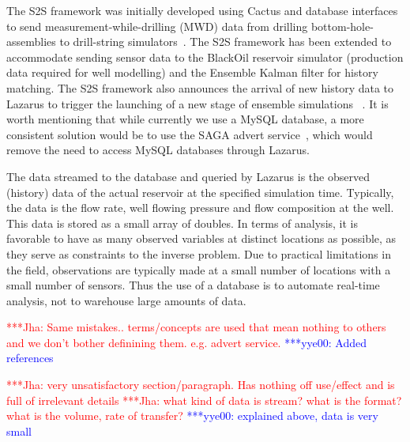 \documentclass{acm_proc_article-sp}
\newcommand{\jhanote}[1]{ {\textcolor{red} { ***Jha: #1 }}}
\newcommand{\yyenote}[1]{ {\textcolor{blue} { ***yye00: #1 }}}
\newcommand{\jhanote}[1]{}
\newcommand{\yyenote}[1]{}
\begin{document}
The S2S framework was initially developed using Cactus and database
interfaces to send measurement-while-drilling (MWD) data from drilling
bottom-hole-assemblies to drill-string simulators~\cite{Duff1,
  Duff2}. The S2S framework has been extended to accommodate sending
sensor data to the BlackOil reservoir simulator (production data
required for well modelling) and the Ensemble Kalman filter for
history matching.  The S2S framework also announces the arrival of new
history data to Lazarus to trigger the launching of a new stage of
ensemble simulations ~\cite{Duff1,Duff2}.  It is worth mentioning that
while currently we use a MySQL database, a more consistent solution
would be to use the SAGA advert service~\cite{saga_sc05}, which would
remove the need to access MySQL databases through Lazarus.

The data streamed to the database and queried by Lazarus is the observed
(history) data of the actual reservoir at the specified simulation time. Typically,
the data is the flow rate, well flowing pressure and flow composition
at the well. This data is stored as a small array of doubles.
In terms of analysis, it is favorable to have as many observed variables
at distinct locations as possible, as they serve as constraints to the inverse
problem. Due to practical limitations in the field, observations are typically made at a
small number of locations with a small number of sensors. Thus the use
of a database is to automate real-time analysis, not to warehouse large amounts of data.


\jhanote{Same mistakes.. terms/concepts are used
that mean nothing to others and we don't bother definining
them. e.g. advert service.}\yyenote{Added references}

\jhanote{very unsatisfactory section/paragraph. Has nothing off
  use/effect and is full of irrelevant details}
\jhanote{what kind of data is stream? what is the format? what is the
  volume, rate of transfer?} \yyenote{explained above, data is very small}
\end{document}
